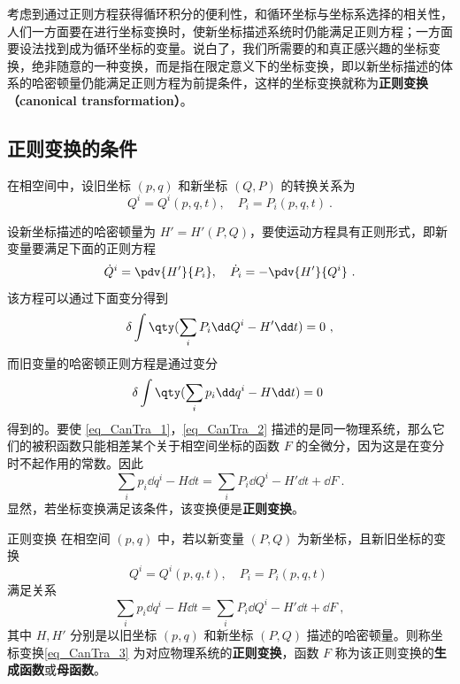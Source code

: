 考虑到通过正则方程获得循环积分的便利性，和循环坐标与坐标系选择的相关性，人们一方面要在进行坐标变换时，使新坐标描述系统时仍能满足正则方程；一方面要设法找到成为循环坐标的变量。说白了，我们所需要的和真正感兴趣的坐标变换，绝非随意的一种变换，而是指在限定意义下的坐标变换，即以新坐标描述的体系的哈密顿量仍能满足正则方程为前提条件，这样的坐标变换就称为\textbf{正则变换（canonical transformation）}。

\subsection{正则变换的条件}
在相空间中，设旧坐标 $(p,q)$ 和新坐标 $(Q,P)$ 的转换关系为
\begin{equation}
Q^i=Q^i(p,q,t),\quad P_i=P_i(p,q,t)~.
\end{equation}

设新坐标描述的哈密顿量为 $H'=H'(P,Q)$，要使运动方程具有正则形式，即新变量要满足下面的正则方程
\begin{equation}
\dot Q^i=\pdv{H'}{P_i},\quad \dot P_i=-\pdv{H'}{Q^i}~.
\end{equation}
该方程可以通过下面变分得到
\begin{equation}\label{eq_CanTra_1}
\delta\int\qty(\sum_iP_i\dd Q^i-H'\dd t)=0~,
\end{equation}
而旧变量的哈密顿正则方程是通过变分
\begin{equation}\label{eq_CanTra_2}
\delta\int\qty(\sum_ip_i\dd q^i-H\dd t)=0~
\end{equation}
得到的。要使 \autoref{eq_CanTra_1}，\autoref{eq_CanTra_2} 描述的是同一物理系统，那么它们的被积函数只能相差某个关于相空间坐标的函数 $F$ 的全微分，因为这是在变分时不起作用的常数。因此
\begin{equation}
\sum_ip_i\dd q^i-H\dd t=\sum_iP_i\dd Q^i-H'\dd t+\dd F~.
\end{equation}
显然，若坐标变换满足该条件，该变换便是\textbf{正则变换}。

\begin{definition}{正则变换}
在相空间 $(p,q)$ 中，若以新变量 $(P,Q)$ 为新坐标，且新旧坐标的变换
\begin{equation}\label{eq_CanTra_3}
Q^i=Q^i(p,q,t),\quad P_i=P_i(p,q,t)~
\end{equation}
满足关系
\begin{equation}\label{eq_CanTra_4}
\sum_ip_i\dd q^i-H\dd t=\sum_iP_i\dd Q^i-H'\dd t+\dd F~,
\end{equation}
其中 $H,H'$ 分别是以旧坐标 $(p,q)$ 和新坐标 $(P,Q)$ 描述的哈密顿量。则称坐标变换\autoref{eq_CanTra_3} 为对应物理系统的\textbf{正则变换}，函数 $F$ 称为该正则变换的\textbf{生成函数}或\textbf{母函数}。
\end{definition}

